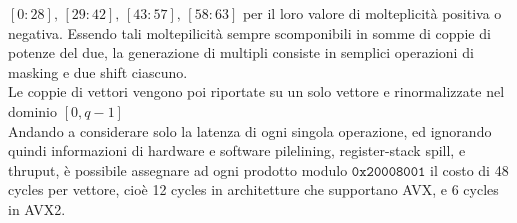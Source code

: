 $[0:28],\,[29:42],\,[43:57],\,[58:63]$ per il loro valore di molteplicità
positiva o negativa. Essendo tali moltepilicità sempre scomponibili in somme di
coppie di potenze del due, la generazione di multipli consiste in semplici
operazioni di masking e due shift ciascuno.\\
Le coppie di vettori vengono poi riportate su un solo vettore e rinormalizzate
nel dominio $[0,q - 1]$
\\
Andando a considerare solo la latenza di ogni singola operazione, ed ignorando
quindi informazioni di hardware e software pilelining, register-stack spill, e
thruput, è possibile assegnare ad ogni prodotto modulo $\mathtt{0x20008001}$ il
costo di 48 cycles per vettore, cioè 12 cycles in architetture che supportano
AVX, e 6 cycles in AVX2.
